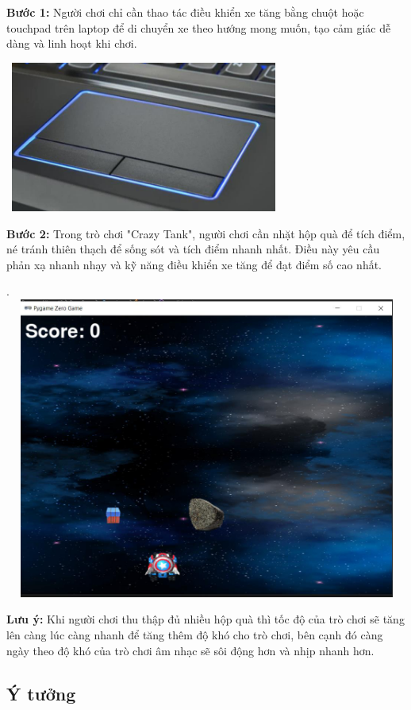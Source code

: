 \documentclass[a4paper]{article}
\begin{document}
\textbf{Bước 1:} Người chơi chỉ cần thao tác điều khiển xe tăng bằng
chuột hoặc touchpad trên laptop để di chuyển xe theo hướng mong muốn,
tạo cảm giác dễ dàng và linh hoạt khi chơi.

\includegraphics[width=3.60417in,height=1.95in]{image5.png}

\textbf{Bước 2:} Trong trò chơi "Crazy Tank", người chơi cần nhặt hộp
quà để tích điểm, né tránh thiên thạch để sống sót và tích điểm nhanh
nhất. Điều này yêu cầu phản xạ nhanh nhạy và kỹ năng điều khiển xe tăng
để đạt điểm số cao nhất.

.\includegraphics[width=6.15555in,height=3.90556in]{image6.png}

\textbf{Lưu ý:} Khi người chơi thu thập đủ nhiều hộp quà thì tốc độ của
trò chơi sẽ tăng lên càng lúc càng nhanh để tăng thêm độ khó cho trò chơi, bên cạnh đó càng ngày theo độ khó của trò chơi âm nhạc sẽ sôi động hơn và nhịp nhanh hơn.
\newpage
\subsection{Ý tưởng}
\end{document}
